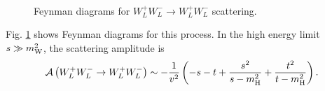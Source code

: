 \begin{figure}[t]
\centering
{}
\hspace{0.5cm}
\hspace{0.5cm}
\\
\vspace{0.5cm}
\hspace{0.5cm}
\caption{Feynman diagrams for $W_L^+W_L^- \to W_L^+W_L^-$ scattering.} 
\label{fig:FD_unitary}
\end{figure}
Fig. \ref{fig:FD_unitary} shows Feynman diagrams for this process.
In the high energy limit $s \gg m_{\mathrm{W}}^2$, the scattering amplitude is \cite{Djouadi20081} 
\begin{eqnarray} 
\label{eq:WWscat}
\mathcal{A}\left( W_L^+W_L^- \to W_L^+W_L^- \right) 
\sim 
- \frac{1}{v^2}  \left( -s - t + \frac{s^2}{s - m_{\mathrm{H}}^2} + \frac{t^2}{t - m_{\mathrm{H}}^2} \right). 
\end{eqnarray} 

